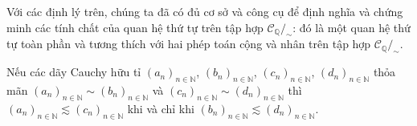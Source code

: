 Với các định lý trên, chúng ta đã có đủ cơ sở và công cụ để định nghĩa và chứng minh các tính chất của quan hệ thứ tự trên tập hợp $\mathscr{C}_{\mathbb{Q}}/_{\sim}$: đó là một quan hệ thứ tự toàn phần và tương thích với hai phép toán cộng và nhân trên tập hợp $\mathscr{C}_{\mathbb{Q}}/_{\sim}$.

\begin{theorem}\label{theorem:equivalent-cauchy-sequences-and-preorder}
    Nếu các dãy Cauchy hữu tỉ ${(a_{n})}_{n\in\mathbb{N}}$, ${(b_{n})}_{n\in\mathbb{N}}$, ${(c_{n})}_{n\in\mathbb{N}}$, ${(d_{n})}_{n\in\mathbb{N}}$ thỏa mãn ${(a_{n})}_{n\in\mathbb{N}}\sim {(b_{n})}_{n\in\mathbb{N}}$ và ${(c_{n})}_{n\in\mathbb{N}}\sim {(d_{n})}_{n\in\mathbb{N}}$ thì ${(a_{n})}_{n\in\mathbb{N}}\lesssim {(c_{n})}_{n\in\mathbb{N}}$ khi và chỉ khi ${(b_{n})}_{n\in\mathbb{N}}\lesssim {(d_{n})}_{n\in\mathbb{N}}$.
\end{theorem}


